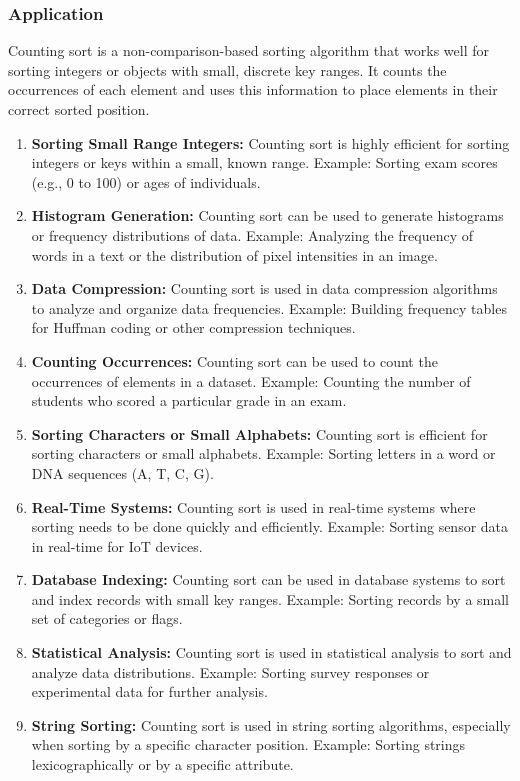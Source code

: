 \subsubsection{Application}
Counting sort is a non-comparison-based sorting algorithm that works well for sorting integers or objects with small, discrete key ranges. It counts the occurrences of each element and uses this information to place elements in their correct sorted position.
\begin{enumerate}
    \item \textbf{Sorting Small Range Integers:} Counting sort is highly efficient for sorting integers or keys within a small, known range. Example: Sorting exam scores (e.g., 0 to 100) or ages of individuals.
    \item \textbf{Histogram Generation:} Counting sort can be used to generate histograms or frequency distributions of data. Example: Analyzing the frequency of words in a text or the distribution of pixel intensities in an image.
    \item \textbf{Data Compression:} Counting sort is used in data compression algorithms to analyze and organize data frequencies. Example: Building frequency tables for Huffman coding or other compression techniques.
    \item \textbf{Counting Occurrences:} Counting sort can be used to count the occurrences of elements in a dataset. Example: Counting the number of students who scored a particular grade in an exam.
    \item \textbf{Sorting Characters or Small Alphabets:} Counting sort is efficient for sorting characters or small alphabets. Example: Sorting letters in a word or DNA sequences (A, T, C, G).
    \item \textbf{Real-Time Systems:} Counting sort is used in real-time systems where sorting needs to be done quickly and efficiently. Example: Sorting sensor data in real-time for IoT devices.
    \item \textbf{Database Indexing:} Counting sort can be used in database systems to sort and index records with small key ranges. Example: Sorting records by a small set of categories or flags.
    \item \textbf{Statistical Analysis:} Counting sort is used in statistical analysis to sort and analyze data distributions. Example: Sorting survey responses or experimental data for further analysis.
    \item \textbf{String Sorting:} Counting sort is used in string sorting algorithms, especially when sorting by a specific character position. Example: Sorting strings lexicographically or by a specific attribute.
\end{enumerate}

